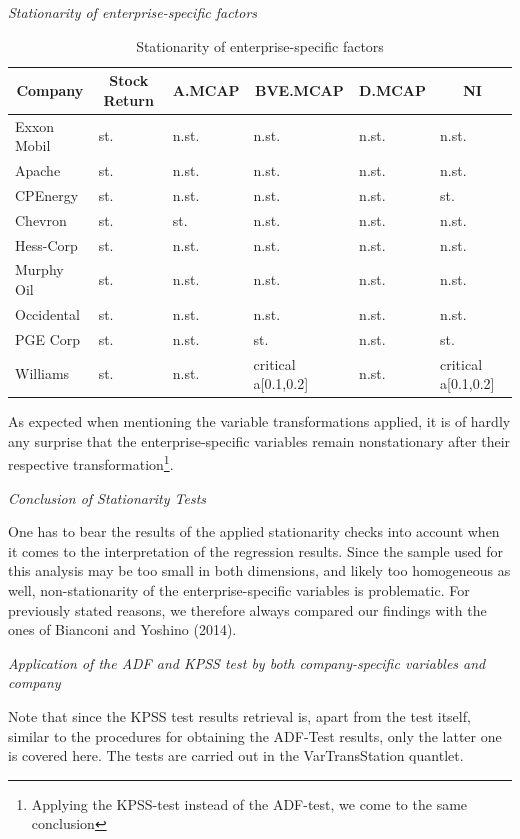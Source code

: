 \documentclass[a4paper]{article}
\begin{document}
\emph{Stationarity of enterprise-specific factors}

\begin{table}[ht] 
\label{}
\centering
\begin{tabular}{l| l| l| l| l| l}
\hline
\hline
\multicolumn{1}{c|}{Company} & \multicolumn{1}{c|}{Stock Return} & \multicolumn{1}{c|}{A.MCAP} & \multicolumn{1}{c|}{BVE.MCAP} & \multicolumn{1}{c|}{D.MCAP} & \multicolumn{1}{c}{NI} \\
\hline
Exxon Mobil & st. & n.st. & n.st. & n.st. & n.st. \\ 
Apache & st. & n.st. & n.st. & n.st. & n.st. \\ 
CPEnergy & st. & n.st. & n.st. & n.st. & st. \\ 
Chevron & st. & st. & n.st. & n.st. & n.st. \\ 
Hess-Corp & st. & n.st. & n.st. & n.st. & n.st. \\
Murphy Oil & st. & n.st. & n.st. & n.st. & n.st. \\ 
Occidental & st. & n.st. & n.st. & n.st. & n.st. \\ 
PGE Corp & st. & n.st. & st. & n.st. & st. \\ 
Williams & st. & n.st. & critical a[0.1,0.2] & n.st. & critical a[0.1,0.2] \\ 
\hline
\hline
\end{tabular}
\caption{Stationarity of enterprise-specific factors} 
\end{table}
As expected when mentioning the variable transformations applied, it is of hardly any surprise that the enterprise-specific variables remain nonstationary after their respective transformation\footnote{Applying the KPSS-test instead of the ADF-test, we come to the same conclusion}. 

\emph{Conclusion of Stationarity Tests}

One has to bear the results of the applied stationarity checks into account when it comes to the interpretation of the regression results. Since the sample used for this analysis may be too small in both dimensions, and likely too homogeneous as well, non-stationarity of the enterprise-specific variables is problematic. For previously stated reasons, we therefore always compared our findings with the ones of Bianconi and Yoshino (2014).
 
\emph{Application of the ADF and KPSS test by both company-specific variables and company}

Note that since the KPSS test results retrieval is, apart from the test itself, similar to the procedures for obtaining the ADF-Test results, only the latter one is covered here. The tests are carried out in the VarTransStation quantlet. 
\end{document}
